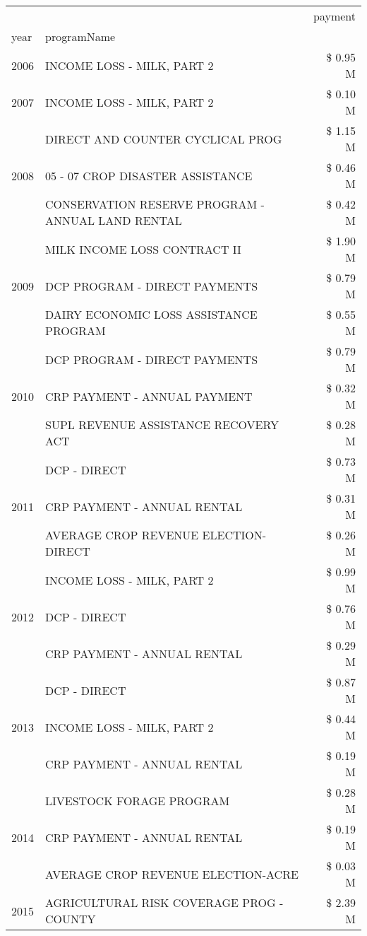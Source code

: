 \begin{tabular}{llr}
\toprule
 &  & payment \\
year & programName &  \\
\midrule
2006 & INCOME LOSS - MILK, PART 2 & \$ 0.95 M \\
\cline{1-3}
2007 & INCOME LOSS - MILK, PART 2 & \$ 0.10 M \\
\cline{1-3}
\multirow[t]{3}{*}{2008} & DIRECT AND COUNTER CYCLICAL PROG & \$ 1.15 M \\
 & 05 - 07 CROP DISASTER ASSISTANCE & \$ 0.46 M \\
 & CONSERVATION RESERVE PROGRAM - ANNUAL LAND RENTAL & \$ 0.42 M \\
\cline{1-3}
\multirow[t]{3}{*}{2009} & MILK INCOME LOSS CONTRACT II & \$ 1.90 M \\
 & DCP PROGRAM - DIRECT PAYMENTS & \$ 0.79 M \\
 & DAIRY ECONOMIC LOSS ASSISTANCE PROGRAM & \$ 0.55 M \\
\cline{1-3}
\multirow[t]{3}{*}{2010} & DCP PROGRAM - DIRECT PAYMENTS & \$ 0.79 M \\
 & CRP PAYMENT - ANNUAL PAYMENT & \$ 0.32 M \\
 & SUPL REVENUE ASSISTANCE RECOVERY ACT & \$ 0.28 M \\
\cline{1-3}
\multirow[t]{3}{*}{2011} & DCP - DIRECT & \$ 0.73 M \\
 & CRP PAYMENT - ANNUAL RENTAL & \$ 0.31 M \\
 & AVERAGE CROP REVENUE ELECTION-DIRECT & \$ 0.26 M \\
\cline{1-3}
\multirow[t]{3}{*}{2012} & INCOME LOSS - MILK, PART 2 & \$ 0.99 M \\
 & DCP - DIRECT & \$ 0.76 M \\
 & CRP PAYMENT - ANNUAL RENTAL & \$ 0.29 M \\
\cline{1-3}
\multirow[t]{3}{*}{2013} & DCP - DIRECT & \$ 0.87 M \\
 & INCOME LOSS - MILK, PART 2 & \$ 0.44 M \\
 & CRP PAYMENT - ANNUAL RENTAL & \$ 0.19 M \\
\cline{1-3}
\multirow[t]{3}{*}{2014} & LIVESTOCK FORAGE PROGRAM & \$ 0.28 M \\
 & CRP PAYMENT - ANNUAL RENTAL & \$ 0.19 M \\
 & AVERAGE CROP REVENUE ELECTION-ACRE & \$ 0.03 M \\
\cline{1-3}
\multirow[t]{3}{*}{2015} & AGRICULTURAL RISK COVERAGE PROG - COUNTY & \$ 2.39 M \\

\end{tabular}
